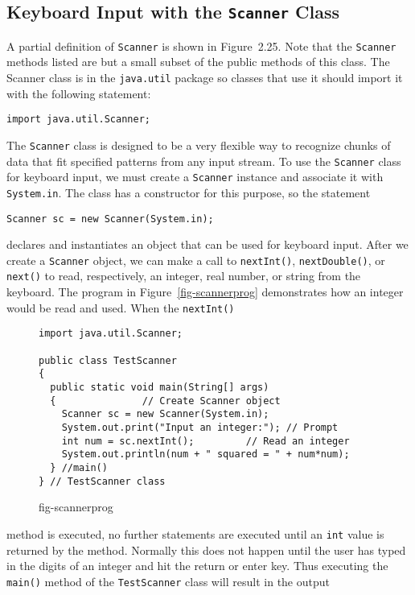 \subsection{Keyboard Input with the {\tt Scanner} Class} 

A partial definition of {\tt Scanner} is shown in Figure~2.25. Note
that the {\tt Scanner} methods listed are but a small subset of the 
public methods of this class.  The Scanner class is in the {\tt java.util}
package so classes that use it should import it with the following statement:

\begin{jjjlisting}
\begin{lstlisting}
import java.util.Scanner;
\end{lstlisting}
\end{jjjlisting}

\noindent The {\tt Scanner} class is designed to be a very flexible way to
recognize chunks of data that fit specified patterns from any input
stream.  To use the {\tt Scanner} class for keyboard input, we must
create a {\tt Scanner} instance and associate it with {\tt System.in}.
The class has a constructor for this purpose, so the statement

\begin{jjjlisting}
\begin{lstlisting}
Scanner sc = new Scanner(System.in);
\end{lstlisting}
\end{jjjlisting}

\noindent declares and instantiates an  object that can be used for keyboard input.
After we create a {\tt Scanner} object, we can make a call to {\tt nextInt()},
{\tt nextDouble()}, or {\tt next()} to read, respectively, an integer, real 
number, or string from the keyboard.  The program in Figure~\ref{fig-scannerprog}
demonstrates how an integer would be read and used. When the {\tt nextInt()}
\begin{figure}[htb]
\jjjprogstart
\begin{jjjlisting}
\begin{lstlisting}
import java.util.Scanner;

public class TestScanner 
{
  public static void main(String[] args) 
  {               // Create Scanner object
    Scanner sc = new Scanner(System.in); 
    System.out.print("Input an integer:"); // Prompt
    int num = sc.nextInt();         // Read an integer
    System.out.println(num + " squared = " + num*num);
  } //main()
} // TestScanner class
\end{lstlisting}
\end{jjjlisting}
{fig-scannerprog}
\end{figure}
method is executed, no further statements are executed until an {\tt int} value
is returned by the method.  Normally this does not happen until the
user has typed in the digits of an integer and hit the return or enter key.
Thus executing the {\tt main()} method of the {\tt TestScanner}  class will 
result in the output 

